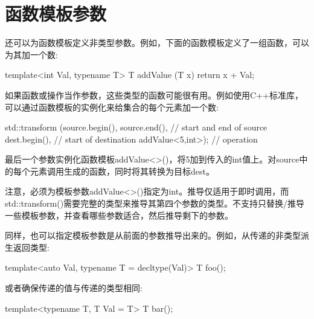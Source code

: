 \section{函数模板参数}
还可以为函数模板定义非类型参数。例如，下面的函数模板定义了一组函数，可以为其加一个数:

\begin{cpp}
template<int Val, typename T>
T addValue (T x)
{
	return x + Val;
}
\end{cpp}

如果函数或操作当作参数，这些类型的函数可能很有用。例如使用C++标准库，可以通过函数模板的实例化来给集合的每个元素加一个数:

\begin{cpp}
std::transform (source.begin(), source.end(), // start and end of source
dest.begin(), // start of destination
addValue<5,int>); // operation
\end{cpp}

最后一个参数实例化函数模板addValue<>()，将5加到传入的int值上。对source中的每个元素调用生成的函数，同时将其转换为目标dest。

注意，必须为模板参数addValue<>()指定为int。推导仅适用于即时调用，而std::transform()需要完整的类型来推导其第四个参数的类型。不支持只替换/推导一些模板参数，并查看哪些参数适合，然后推导剩下的参数。

同样，也可以指定模板参数是从前面的参数推导出来的。例如，从传递的非类型派生返回类型:

\begin{cpp}
template<auto Val, typename T = decltype(Val)>
T foo();
\end{cpp}

或者确保传递的值与传递的类型相同:

\begin{cpp}
template<typename T, T Val = T{}>
T bar();
\end{cpp}































